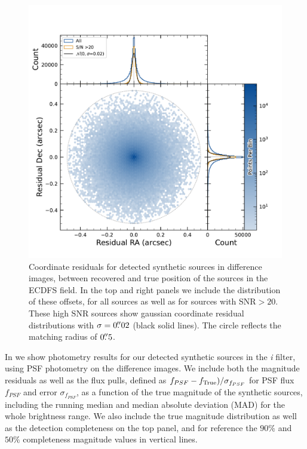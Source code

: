 \begin{figure}[htb!]
\includegraphics[width=\linewidth]{coordinate_offsets_hexbin}
\caption{Coordinate residuals for detected synthetic sources in difference images, between recovered and true position of the sources in the \gls{ECDFS} field. 
In the top and right panels we include the distribution of these offsets, for all sources as well as for sources with SNR$>20$. 
These high SNR sources show gaussian coordinate residual distributions with $\sigma=0\mbox{$.\!\!^{\prime\prime}$}02$ (black solid lines). 
The circle reflects the matching radius of $0\mbox{$.\!\!^{\prime\prime}$}5$.}
\label{fig:coordinate_offset_diffim_fakes}
\end{figure}
%
In  we show photometry results for our detected synthetic sources in the \textit{i} filter, using \gls{PSF} photometry on the difference images. 
We include both the magnitude residuals as well as the flux pulls, defined as $f_{PSF}-f_{\rm{True}})/\sigma_{f_{PSF}}$ for PSF \gls{flux} $f_{PSF}$ and error $\sigma_{f_{PSF}}$,  
as a function of the true magnitude of the synthetic sources, including the running median and median absolute deviation (MAD) for the whole brightness range. 
We also include the true magnitude distribution as well as the detection completeness on the top panel, and for reference the $90\%$ and $50\%$ completeness magnitude values in vertical lines. 
